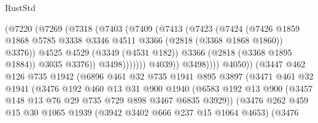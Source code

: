 \begin{lexlean}{RustStd}
\begin{coremodule}
                                  (@7220
                                    (@7269
                                      (@7318
                                        (@7403
                                          (@7409
                                            (@7413
                                              (@7423
                                                (@7424
                                                  (@7426
                                                    @1859
                                                    @1868
                                                    @5785
                                                    @3338
                                                    @3346
                                                    @4511
                                                    @3366
                                                    (@2818 (@3368 @1868 @1860))
                                                    @3376))
                                                @4525
                                                @4529
                                                (@3349 (@4531 @182))
                                                @3366
                                                (@2818 (@3368 @1895 @1884))
                                                @3035
                                                @3376))
                                            @3498)))))))
                              @4039))
                          @3498))))
                  @4050))
              (@3447
                @462
                @126
                @735
                @1942
                (@6896
                  @461
                  @32
                  @735
                  @1941
                  @895
                  @3897
                  (@3471
                    @461
                    @32
                    @1941
                    (@3476
                      @192
                      @460
                      @13
                      @31
                      @900
                      @1940
                      (@6583
                        @192
                        @13
                        @900
                        (@3457 @148 @13 @76 @29 @735 @729 @898 @3467 @6835 @3929))
                      (@3476
                        @262
                        @459
                        @15
                        @30
                        @1065
                        @1939
                        (@3942 @3402 @666 @237 @15 @1064 @4653)
                        (@3476

\end{coremodule}
\end{lexlean}
